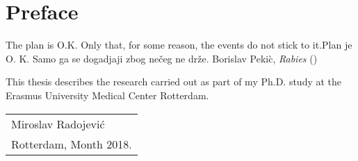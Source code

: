 %
\chpos{14mm}{10mm}
\chapter*{Preface}

{The plan is O.K. Only that, for some reason, the events do not stick to it.\newline Plan je O. K. Samo ga se dogadjaji zbog ne\v{c}eg ne dr\v{z}e.}
{Borislav Peki\`{c}, \emph{Rabies} ()\nocite{}}





This thesis describes the research carried out as part of my Ph.D. study at the Erasmus University Medical Center Rotterdam. 
\bigskip
\begin{flushright}
  \begin{tabular}{@{}l@{}}
    Miroslav Radojevi\'{c}\\
    Rotterdam, Month 2018.
  \end{tabular}
\end{flushright}
